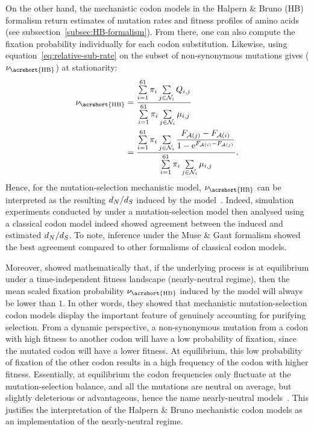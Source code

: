 On the other hand, the mechanistic \gls{codon} models in the Halpern \& Bruno (\acrshort{HB}) formalism return estimates of mutation rates and fitness profiles of amino acids (see subsection~\ref{subsec:HB-formalism}).
From there, one can also compute the fixation probability individually for each \gls{codon} \gls{substitution}.
Likewise, using equation~\ref{eq:relative-sub-rate} on the subset of \gls{non-synonymous} mutations gives ($\avgpfix_{\text{\acrshort{HB}}}$) at stationarity:
\begin{align}
    \avgpfix_{\text{\acrshort{HB}}} & = \dfrac{ \sum\limits\sumOverCodons \subequi_{\ci} \sum\limits_{\cj \in \NonSyn_{\ci}} Q_{\itoj}}{\sum\limits\sumOverCodons \subequi_{\ci} \sum\limits_{\cj \in \NonSyn_{\ci}} \mu_{\itoj}} \\
    & = \dfrac{ \sum\limits\sumOverCodons \subequi_{\ci} \sum\limits_{\cj \in \NonSyn_{\ci}} \dfrac{\Fitj - \Fiti}{1 - \e^{\Fiti - \Fitj} }}{\sum\limits\sumOverCodons \subequi_{\ci} \sum\limits_{\cj \in \NonSyn_{\ci} } \mu_{\itoj}}.
\end{align}
Hence, for the mutation-selection mechanistic model, $\avgpfix_{\text{\acrshort{HB}}}$ can be interpreted as the resulting $d_N / d_S$ induced by the model~\citep{Spielman2015,DosReis2015}.
Indeed, simulation experiments conducted by \citet{Spielman2015} under a mutation-selection model then analysed using a classical \gls{codon} model indeed showed agreement between the induced and estimated $d_N / d_S$.
To note, inference under the Muse \& Gaut formalism showed the best agreement compared to other formalisms of classical \gls{codon} models.

Moreover, \citet{Spielman2015} showed mathematically that, if the underlying process is at equilibrium under a time-independent fitness landscape (nearly-neutral regime), then the mean scaled fixation probability $\avgpfix_{\text{\acrshort{HB}}}$ induced by the model will always be lower than $1$.
In other words, they showed that mechanistic mutation-selection \gls{codon} models display the important feature of genuinely accounting for purifying selection.
From a dynamic perspective, a \gls{non-synonymous} mutation from a \gls{codon} with high fitness to another \gls{codon} will have a low probability of fixation, since the mutated \gls{codon} will have a lower fitness.
At equilibrium, this low probability of fixation of the other \gls{codon} results in a high frequency of the \gls{codon} with higher fitness.
Essentially, at equilibrium the \gls{codon} frequencies only fluctuate at the mutation-selection balance, and all the mutations are \gls{neutral} on average, but slightly deleterious or advantageous, hence the name \gls{nearly-neutral} models~\citep{Ohta1973, Ohta1992, Rodrigue2016}.
This justifies the interpretation of the Halpern \& Bruno mechanistic \gls{codon} models as an implementation of the \gls{nearly-neutral} regime.

